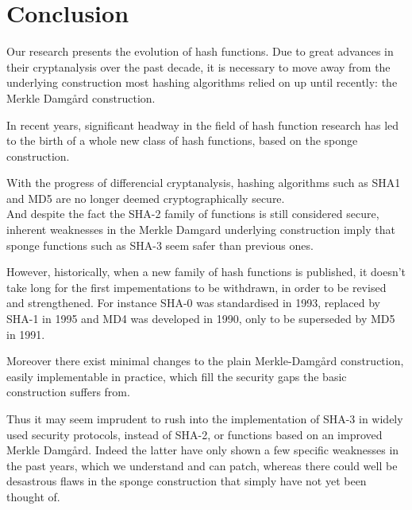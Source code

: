 \chapter*{Conclusion}

Our research presents the evolution of hash functions. Due to great advances in their cryptanalysis over the past decade, it is necessary to move away from the underlying construction most hashing algorithms relied on up until recently: the Merkle Damg\r{a}rd construction.

In recent years, significant headway in the field of hash function research has led to the birth of a whole new class of hash functions, based on the sponge construction.

With the progress of differencial cryptanalysis,  hashing algorithms such as SHA1 and MD5 are no longer deemed cryptographically secure.\\
And despite the fact the SHA-2 family of functions is still considered secure, inherent weaknesses in the Merkle Damgard underlying construction imply that sponge functions such as SHA-3 seem safer than previous ones.

However, historically, when a new family of hash functions is published, it doesn't take long for the first impementations to be withdrawn, in order to be revised and strengthened. For instance SHA-0 was standardised in 1993, replaced by SHA-1 in 1995 and MD4 was developed in 1990, only to be superseded by MD5 in 1991.

Moreover there exist minimal changes to the plain Merkle-Damg\r{a}rd construction, easily implementable in practice, which fill the security gaps the basic construction suffers from.

Thus it may seem imprudent to rush into the implementation of SHA-3 in widely used security protocols, instead of SHA-2, or functions based on an improved Merkle Damg\r{a}rd. Indeed the latter have only shown a few specific weaknesses in the past years, which we understand and can patch, whereas there could well be desastrous flaws in the sponge construction that simply have not yet been thought of.\\
\newline
